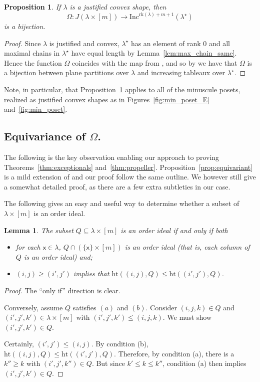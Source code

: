 \documentclass[12pt]{amsart}
\newcommand{\x}{\ensuremath{\mathsf{x}}}
\newtheorem{lemma}[theorem]{Lemma}
\newtheorem{proposition}[theorem]{Proposition}
\theoremstyle{definition}
\theoremstyle{remark}
\numberwithin{equation}{section}
\newcommand{\inc}{\ensuremath{\mathrm{Inc}}}
\newcommand{\rank}{\ensuremath{\mathrm{rk}}}
\begin{document}
\begin{proposition}\label{prop:bijection}
If $\lambda$ is a justified convex shape, then 
\[\Omega : J(\lambda \times [m]) \rightarrow \inc^{\rank(\lambda)+ m+1}(\lambda^\star)
\]
 is a bijection.
\end{proposition}
\begin{proof}
Since $\lambda$ is justified and convex, $\lambda^{\star}$ has an element of rank $0$ and all maximal chains in $\lambda^\star$ have equal length by Lemma~\ref{lem:max_chain_same}. Hence the function $\Omega$ coincides with the map from \cite[Proposition~8.2]{HPPW}, and so by \cite[Proposition~8.2]{HPPW} we have that $\Omega$ is a bijection between plane partitions over $\lambda$ and increasing tableaux over $\lambda^\star$.
\end{proof}

Note, in particular, that Proposition~\ref{prop:bijection} applies to all of the minuscule posets, realized as justified convex shapes as in Figures~\ref{fig:min_poset_E} and~\ref{fig:min_poset}.

\subsection{Equivariance of $\Omega$.} 
The following is the key observation enabling our approach to proving Theorems~\ref{thm:exceptionals} and~\ref{thm:propeller}. Proposition~\ref{prop:equivariant} is a mild extension of \cite[Lemma~4.2]{DPS} and our proof follow the same outline. We however still give a somewhat detailed proof, as there are a few extra subtleties in our case.

The following gives an easy and useful way to determine whether a subset of $\lambda \times [m]$ is an order ideal. 
\begin{lemma}\label{lem:whos_an_ideal?}
The subset $Q \subseteq \lambda \times [m]$ is an order ideal if and only if both
\begin{itemize}
\item[(a)] for each $\x \in \lambda$, $Q \cap (\{\x\} \times [m])$ is an order ideal (that is, each column of $Q$ is an order ideal) and;
\item[(b)] $(i,j) \geq (i',j')$ implies that $\mathrm{ht}((i,j),Q) \leq \mathrm{ht}((i',j'),Q)$.
\end{itemize}
\end{lemma}
\begin{proof} 
The ``only if'' direction is clear. 

Conversely, assume $Q$ satisfies $(a)$ and $(b)$. Consider $(i,j,k) \in Q$ and $(i',j',k') \in \lambda \times [m]$ with $(i',j',k') \leq (i,j,k)$. We must show $(i',j',k') \in Q$. 

Certainly, $(i',j') \leq (i,j)$. By condition (b), $\mathrm{ht}((i,j),Q) \leq \mathrm{ht}((i',j'),Q)$. Therefore, by condition (a), there is a $k'' \geq k$ with $(i',j',k'') \in Q$. But since $k' \leq k \leq k''$, condition (a) then implies $(i',j',k') \in Q$. 
\end{proof}
\end{document}
